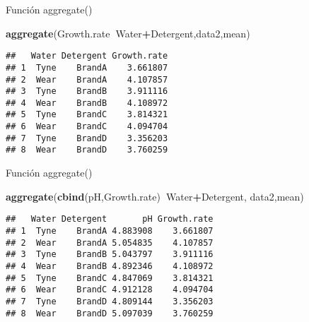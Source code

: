 \documentclass[ignorenonframetext,]{beamer}
\newenvironment{Shaded}{\begin{snugshade}}{\end{snugshade}}
\newcommand{\KeywordTok}[1]{\textcolor[rgb]{0.13,0.29,0.53}{\textbf{#1}}}
\newcommand{\OperatorTok}[1]{\textcolor[rgb]{0.81,0.36,0.00}{\textbf{#1}}}
\newcommand{\NormalTok}[1]{#1}
\begin{document}
\begin{frame}[fragile]{Función aggregate()}

\begin{Shaded}
\begin{Highlighting}[]
\KeywordTok{aggregate}\NormalTok{(Growth.rate}\OperatorTok{~}\NormalTok{Water}\OperatorTok{+}\NormalTok{Detergent,data2,mean)}
\end{Highlighting}
\end{Shaded}

\begin{verbatim}
##   Water Detergent Growth.rate
## 1  Tyne    BrandA    3.661807
## 2  Wear    BrandA    4.107857
## 3  Tyne    BrandB    3.911116
## 4  Wear    BrandB    4.108972
## 5  Tyne    BrandC    3.814321
## 6  Wear    BrandC    4.094704
## 7  Tyne    BrandD    3.356203
## 8  Wear    BrandD    3.760259
\end{verbatim}

\end{frame}

\begin{frame}[fragile]{Función aggregate()}

\begin{Shaded}
\begin{Highlighting}[]
\KeywordTok{aggregate}\NormalTok{(}\KeywordTok{cbind}\NormalTok{(pH,Growth.rate)}\OperatorTok{~}\NormalTok{Water}\OperatorTok{+}\NormalTok{Detergent,}
\NormalTok{          data2,mean)}
\end{Highlighting}
\end{Shaded}

\begin{verbatim}
##   Water Detergent       pH Growth.rate
## 1  Tyne    BrandA 4.883908    3.661807
## 2  Wear    BrandA 5.054835    4.107857
## 3  Tyne    BrandB 5.043797    3.911116
## 4  Wear    BrandB 4.892346    4.108972
## 5  Tyne    BrandC 4.847069    3.814321
## 6  Wear    BrandC 4.912128    4.094704
## 7  Tyne    BrandD 4.809144    3.356203
## 8  Wear    BrandD 5.097039    3.760259
\end{verbatim}

\end{frame}
\end{document}
